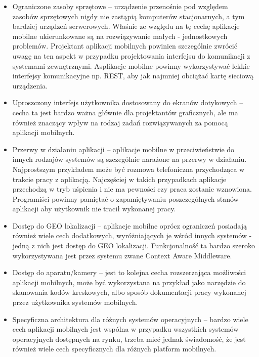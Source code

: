 \begin{itemize}
\item Ograniczone zasoby sprzętowe -- urządzenie przenośnie pod względem zasobów sprzętowych nigdy nie zastąpią komputerów stacjonarnych, a tym bardziej urządzeń serwerowych. Właśnie ze względu na tę cechę aplikacje mobilne ukierunkowane są na rozwiązywanie małych - jednostkowych problemów. Projektant aplikacji mobilnych powinien szczególnie zwrócić uwagę na ten aspekt w przypadku projektowania interfejsu do komunikacji z systemami zewnętrznymi. Asplikacje mobilne powinny wykorzystywać lekkie interfejsy komunikacyjne np. REST, aby jak najmniej obciążać kartę sieciową urządzenia. 
\item Uproszczony interfejs użytkownika dostosowany do ekranów dotykowych -- cecha ta jest bardzo ważna głównie dla projektantów graficznych, ale ma również znaczący wpływ na rodzaj zadań rozwiązywanych za pomocą aplikacji mobilnych.  
\item Przerwy w działaniu aplikacji -- aplikacje mobilne w przeciwieństwie do innych rodzajów systemów są szczególnie narażone na przerwy w działaniu. Najprostszym przykładem może być rozmowa telefoniczna przychodząca w trakcie pracy z aplikacją. Najczęściej w takich przypadkach aplikacje przechodzą w tryb uśpienia i nie ma pewności czy praca zostanie wznowiona. Programiści powinny pamiętać o zapamiętywaniu poszczególnych stanów aplikacji aby użytkownik nie tracił wykonanej pracy. 
\item Dostęp do GEO lokalizacji -- aplikacje mobilne oprócz ograniczeń posiadają również wiele cech dodatkowych, wyróżniających je wśród innych systemów - jedną z nich jest dostęp do GEO lokalizacji.  Funkcjonalność ta bardzo szeroko wykorzystywana jest przez systemu zwane Context Aware Middleware. 
\item Dostęp do aparatu/kamery -- jest to kolejna cecha rozszerzająca możliwości aplikacji mobilnych, może być wykorzystana na przykład jako narzędzie do skanowania kodów kreskowych, albo sposób dokumentacji pracy wykonanej przez użytkownika systemów mobilnych. 
\item Specyficzna architektura dla różnych systemów operacyjnych -- bardzo wiele cech aplikacji mobilnych jest wspólna w przypadku wszystkich systemów operacyjnych dostępnych na rynku, trzeba mieć jednak świadomość, że jest również wiele cech specyficznych dla różnych platform mobilnych. 
\end{itemize}

